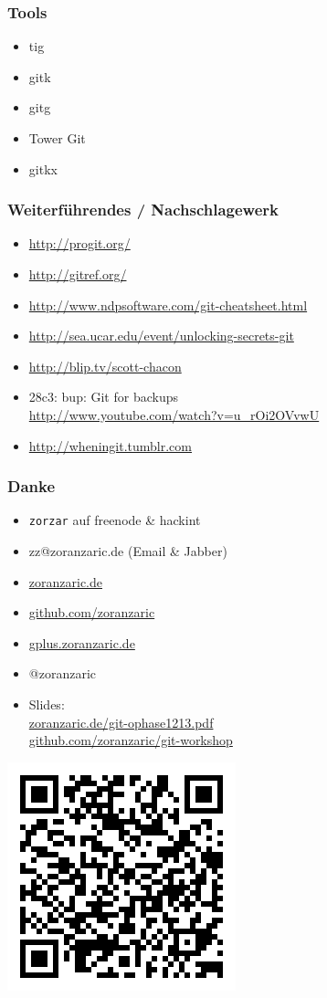 \documentclass[]{beamer}
\begin{document}
\begin{frame}
	\frametitle{Tools}
	\begin{itemize}
		\item
			tig
		\item
			gitk
		\item
			gitg
		\item
			Tower Git
		\item
			gitkx
	\end{itemize}
\end{frame}

\begin{frame}
	\frametitle{Weiterführendes / Nachschlagewerk}
	\begin{itemize}
		\item
			\url{http://progit.org/}
		\item
			\url{http://gitref.org/}
		\item
			\url{http://www.ndpsoftware.com/git-cheatsheet.html}
		\item
			\url{http://sea.ucar.edu/event/unlocking-secrets-git}
		\item
			\url{http://blip.tv/scott-chacon}
		\item
			28c3: bup: Git for backups\\
			\url{http://www.youtube.com/watch?v=u_rOi2OVvwU}
		\item
			\url{http://wheningit.tumblr.com}
	\end{itemize}
\end{frame}

\begin{frame}[fragile]
	\frametitle{Danke}
	\begin{itemize}
		\item
			\verb|zorzar| auf freenode \& hackint
		\item
			zz@zoranzaric.de (Email \& Jabber)
		\item
			\url{zoranzaric.de}
		\item
			\url{github.com/zoranzaric}
		\item
			\url{gplus.zoranzaric.de}
		\item
			@zoranzaric\\[0.5cm]
		\item
			Slides:\\
			\url{zoranzaric.de/git-ophase1213.pdf}\\
			\url{github.com/zoranzaric/git-workshop}
	\end{itemize}
\end{frame}

\begin{frame}
	\includegraphics{qr-code.png}
\end{frame}
\end{document}
